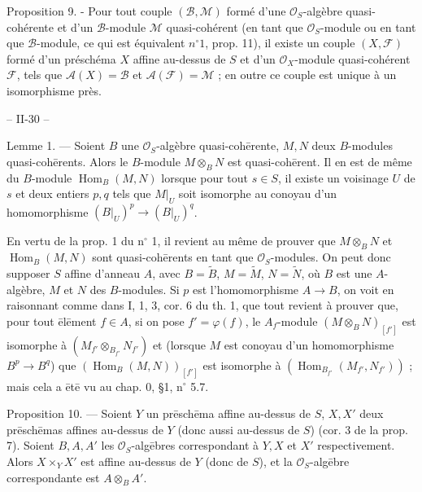 Proposition 9. - Pour tout couple $(\mathcal{B}, \mathcal{M})$ formé d'une $\mathcal{O}_S$-algèbre quasi-cohérente et d'un $\mathcal{B}$-module $\mathcal{M}$ quasi-cohérent (en tant que $\mathcal{O}_S$-module ou en tant que $\mathcal{B}$-module, ce qui est équivalent $n^\circ 1$, prop. 11), il existe un couple $(X, \mathcal{F})$ formé d'un préschéma $X$ affine au-dessus de $S$ et d'un $\mathcal{O}_X$-module quasi-cohérent $\mathcal{F}$, tels que $\mathcal{A}(X) = \mathcal{B}$ et $\mathcal{A}(\mathcal{F}) = \mathcal{M}$ ; en outre ce couple est unique à un isomorphisme près.

\newpage


-- II-30 --

Lemme 1. — Soient $B$ une $\mathcal{O}_S$-algèbre quasi-coh\=erente, $M, N$ deux $B$-modules quasi-coh\=erents. Alors le $B$-module $M \otimes_B N$ est quasi-coh\=erent. Il en est de m\^eme du $B$-module $\operatorname{Hom}_B(M, N)$ lorsque pour tout $s \in S$, il existe un voisinage $U$ de $s$ et deux entiers $p, q$ tels que $M|_U$ soit isomorphe au conoyau d'un homomorphisme $(B|_U)^p \to (B|_U)^q$.

En vertu de la prop. 1 du n$^\circ$ 1, il revient au m\^eme de prouver que $M \otimes_B N$ et $\operatorname{Hom}_B(M, N)$ sont quasi-coh\=erents en tant que $\mathcal{O}_S$-modules. On peut donc supposer $S$ affine d'anneau $A$, avec $B = \tilde{B}$, $M = \tilde{M}$, $N = \tilde{N}$, o\`u $B$ est une $A$-algèbre, $M$ et $N$ des $B$-modules. Si $p$ est l'homomorphisme $A \to B$, on voit en raisonnant comme dans I, 1, 3, cor. 6 du th. 1, que tout revient \`a prouver que, pour tout \=el\=ement $f \in A$, si on pose $f' = \varphi(f)$, le $A_f$-module $(M \otimes_B N)_{[f']}$ est isomorphe \`a $(M_{f'} \otimes_{B_{f'}} N_{f'})$ et (lorsque $M$ est conoyau d'un homomorphisme $B^p \to B^q$) que $(\operatorname{Hom}_B(M, N))_{[f']}$ est isomorphe \`a $(\operatorname{Hom}_{B_{f'}}(M_{f'}, N_{f'}))$ ; mais cela a \=et\=e vu au chap. 0, \S 1, n$^\circ$ 5.7.

Proposition 10. — Soient $Y$ un pr\=esch\=ema affine au-dessus de $S$, $X, X'$ deux pr\=esch\=emas affines au-dessus de $Y$ (donc aussi au-dessus de $S$) (cor. 3 de la prop. 7). Soient $B, A, A'$ les $\mathcal{O}_S$-alg\=ebres correspondant \`a $Y, X$ et $X'$ respectivement. Alors $X \times_Y X'$ est affine au-dessus de $Y$ (donc de $S$), et la $\mathcal{O}_S$-alg\=ebre correspondante est $A \otimes_B A'$.

